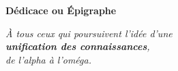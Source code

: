 \begin{titlepage}
	\thispagestyle{empty}
	\centering
	
	\vspace*{3cm}
	
	{\Large \textbf{Dédicace ou Épigraphe}}
	
	\vspace{2cm}
	
	\begin{minipage}{0.8\textwidth}
		\centering
		\textit{
			À tous ceux qui poursuivent l’idée d’une \\
			\textbf{unification des connaissances}, \\
			de l’alpha à l’oméga.
		}
	\end{minipage}
	
	\vfill
	
\end{titlepage}
